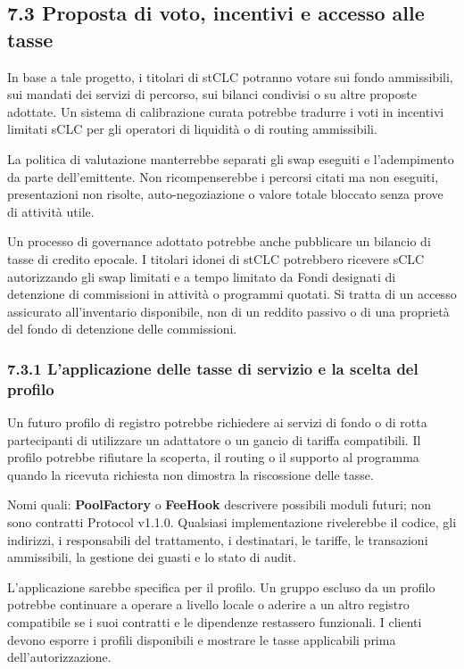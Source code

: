 \documentclass[11pt]{article}
\begin{document}
\subsection*{7.3 Proposta di voto, incentivi e accesso alle tasse}

In base a tale progetto, i titolari di stCLC potranno votare sui fondo ammissibili, sui mandati dei servizi di percorso, sui bilanci condivisi o su altre proposte adottate. Un sistema di calibrazione curata potrebbe tradurre i voti in incentivi limitati sCLC per gli operatori di liquidità o di routing ammissibili.

La politica di valutazione manterrebbe separati gli swap eseguiti e l'adempimento da parte dell'emittente. Non ricompenserebbe i percorsi citati ma non eseguiti, presentazioni non risolte, auto-negoziazione o valore totale bloccato senza prove di attività utile.

Un processo di governance adottato potrebbe anche pubblicare un bilancio di tasse di credito epocale. I titolari idonei di stCLC potrebbero ricevere sCLC autorizzando gli swap limitati e a tempo limitato da Fondi designati di detenzione di commissioni in attività o programmi quotati. Si tratta di un accesso assicurato all'inventario disponibile, non di un reddito passivo o di una proprietà del fondo di detenzione delle commissioni.

\subsubsection*{7.3.1 L'applicazione delle tasse di servizio e la scelta del profilo}

Un futuro profilo di registro potrebbe richiedere ai servizi di fondo o di rotta partecipanti di utilizzare un adattatore o un gancio di tariffa compatibili. Il profilo potrebbe rifiutare la scoperta, il routing o il supporto al programma quando la ricevuta richiesta non dimostra la riscossione delle tasse.

Nomi quali: \textbf{PoolFactory } o \textbf{ FeeHook} descrivere possibili moduli futuri; non sono contratti Protocol v1.1.0. Qualsiasi implementazione rivelerebbe il codice, gli indirizzi, i responsabili del trattamento, i destinatari, le tariffe, le transazioni ammissibili, la gestione dei guasti e lo stato di audit.

L'applicazione sarebbe specifica per il profilo. Un gruppo escluso da un profilo potrebbe continuare a operare a livello locale o aderire a un altro registro compatibile se i suoi contratti e le dipendenze restassero funzionali. I clienti devono esporre i profili disponibili e mostrare le tasse applicabili prima dell'autorizzazione.
\end{document}
